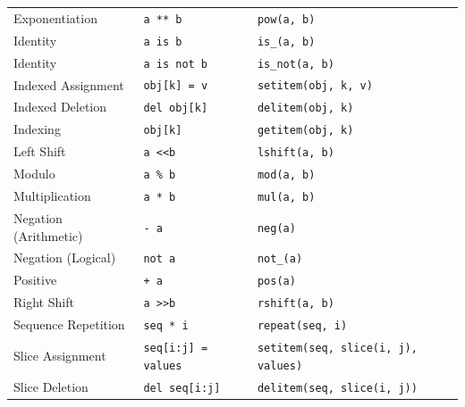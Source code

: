 \documentclass{l4proj}
\begin{document}
\begin{table}[]
\begin{tabular}{@{}lll@{}}
    Exponentiation        & \texttt{a ** b}                         & \texttt{pow(a, b)}                                    \\
    Identity              & \texttt{a is b}                         & \texttt{is\_(a, b)}                                   \\
    Identity              & \texttt{a is not b}                     & \texttt{is\_not(a, b)}                                \\
    Indexed Assignment    & \texttt{obj{[}k{]} = v}                 & \texttt{setitem(obj, k, v)}                           \\
    Indexed Deletion      & \texttt{del obj{[}k{]}}                 & \texttt{delitem(obj, k)}                              \\
    Indexing              & \texttt{obj{[}k{]}}                     & \texttt{getitem(obj, k)}                              \\
    Left Shift            & \texttt{a \textless{}\textless b}       & \texttt{lshift(a, b)}                                 \\
    Modulo                & \texttt{a \% b}                         & \texttt{mod(a, b)}                                    \\
    Multiplication        & \texttt{a * b}                          & \texttt{mul(a, b)}                                    \\
    Negation (Arithmetic) & \texttt{- a}                            & \texttt{neg(a)}                                       \\
    Negation (Logical)    & \texttt{not a}                          & \texttt{not\_(a)}                                     \\
    Positive              & \texttt{+ a}                            & \texttt{pos(a)}                                       \\
    Right Shift           & \texttt{a \textgreater{}\textgreater b} & \texttt{rshift(a, b)}                                 \\
    Sequence Repetition   & \texttt{seq * i}                        & \texttt{repeat(seq, i)}                               \\
    Slice Assignment      & \texttt{seq{[}i:j{]} = values}          & \texttt{setitem(seq, slice(i, j), values)}            \\
    Slice Deletion        & \texttt{del seq{[}i:j{]}}               & \texttt{delitem(seq, slice(i, j))}                    \\

\end{tabular}
\end{table}
\end{document}
